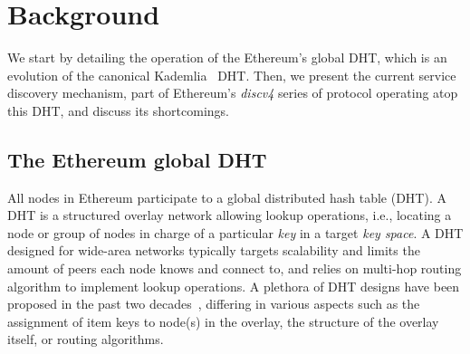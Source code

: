 

\section{Background}
\label{sec:background}

We start by detailing the operation of the Ethereum's global DHT, which is an evolution of the canonical Kademlia~\cite{maymounkov2002kademlia} DHT.
Then, we present the current service discovery mechanism, part of Ethereum's \emph{discv4} series of protocol operating atop this DHT, and discuss its shortcomings.

\subsection{The Ethereum global DHT}
\label{sec:background:dht}

All nodes in Ethereum participate to a global distributed hash table (DHT).
A DHT is a structured overlay network allowing lookup operations, i.e., locating a node or group of nodes in charge of a particular \emph{key} in a target \emph{key space}.
A DHT designed for wide-area networks typically targets scalability and limits the amount of peers each node knows and connect to, and relies on multi-hop routing algorithm to implement lookup operations.
A plethora of DHT designs have been proposed in the past two decades~\cite{chord,rowstron2001pastry}, differing in various aspects such as the assignment of item keys to node(s) in the overlay, the structure of the overlay itself, or routing algorithms.

